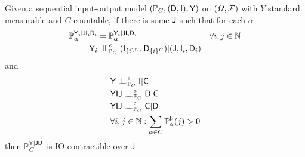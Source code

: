 \begin{theorem}\label{th:ind}
Given a sequential input-output model $(\mathbb{P}_C,(\mathsf{D},\mathsf{I}),\mathsf{Y})$ on $(\Omega,\mathcal{F})$ with $Y$ standard measurable and $C$ countable, if there is some $\mathsf{J}$ such that for each $\alpha$
\begin{align}
    \prob{P}_\alpha^{\RV{Y}_i|\RV{J}\RV{I}_i\RV{D}_i} &= \prob{P}_\alpha^{\RV{Y}_i|\RV{J}\RV{I}_i\RV{D}_i} &\forall i,j\in \mathbb{N}\\
    \RV{Y}_i&\CI^e_{\prob{P}_C} (\RV{I}_{\{i\}^C},\RV{D}_{\{i\}^C})|(\RV{J},\RV{I}_i,\RV{D}_i)
\end{align}
and
\begin{align}
    &\RV{Y}\CI^e_{\prob{P}_C} \RV{I} | \RV{C}\\
    &\RV{YIJ}\CI^e_{\prob{P}_C} \RV{D}|\RV{C}\\
    &\RV{YIJ}\CI^e_{\prob{P}_C} \RV{C}|\RV{D}\\
    &\forall i,j\in \mathbb{N}: \sum_{\alpha\in C} \prob{P}_\alpha^{\RV{I}_i}(j)>0
\end{align}
then $\mathbb{P}_C^{\mathsf{Y}|\mathsf{JD}}$ is IO contractible over $\mathsf{J}$.
\end{theorem}

